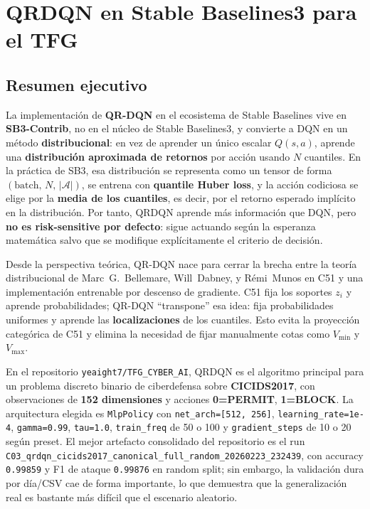 ﻿\documentclass[12pt,a4paper]{article}
\begin{document}
\section{QRDQN en Stable Baselines3 para el TFG}

\subsection{Resumen ejecutivo}

La implementación de \textbf{QR-DQN} en el ecosistema de Stable Baselines vive en
\textbf{SB3-Contrib}, no en el núcleo de Stable Baselines3, y convierte a DQN en un método
\textbf{distribucional}: en vez de aprender un único escalar \(Q(s,a)\), aprende una
\textbf{distribución aproximada de retornos} por acción usando \(N\) cuantiles. En la práctica de
SB3, esa distribución se representa como un tensor de forma
\((\text{batch},\, N,\, |\mathcal{A}|)\), se entrena con \textbf{quantile Huber loss}, y la acción
codiciosa se elige por la \textbf{media de los cuantiles}, es decir, por el retorno esperado
implícito en la distribución. Por tanto, QRDQN aprende más información que DQN, pero \textbf{no es
risk-sensitive por defecto}: sigue actuando según la esperanza matemática salvo que se modifique
explícitamente el criterio de decisión.

Desde la perspectiva teórica, QR-DQN nace para cerrar la brecha entre la teoría distribucional de
Marc~G.~Bellemare, Will~Dabney, y Rémi~Munos en C51 y una implementación entrenable por descenso de
gradiente. C51 fija los soportes \(z_i\) y aprende probabilidades; QR-DQN ``transpone'' esa idea:
fija probabilidades uniformes y aprende las \textbf{localizaciones} de los cuantiles. Esto evita la
proyección categórica de C51 y elimina la necesidad de fijar manualmente cotas como \(V_{\min}\) y
\(V_{\max}\).

En el repositorio \texttt{yeaight7/TFG\_CYBER\_AI}, QRDQN es el algoritmo principal para un
problema discreto binario de ciberdefensa sobre \textbf{CICIDS2017}, con observaciones de
\textbf{152 dimensiones} y acciones \textbf{0=PERMIT}, \textbf{1=BLOCK}. La arquitectura elegida es
\texttt{MlpPolicy} con \texttt{net\_arch=[512, 256]}, \texttt{learning\_rate=1e-4},
\texttt{gamma=0.99}, \texttt{tau=1.0}, \texttt{train\_freq} de 50 o 100 y
\texttt{gradient\_steps} de 10 o 20 según preset. El mejor artefacto consolidado del repositorio es
el run \texttt{C03\_qrdqn\_cicids2017\_canonical\_full\_random\_20260223\_232439}, con accuracy
\texttt{0.99859} y F1 de ataque \texttt{0.99876} en random split; sin embargo, la validación dura
por día/CSV cae de forma importante, lo que demuestra que la generalización real es bastante más
difícil que el escenario aleatorio.
\end{document}
